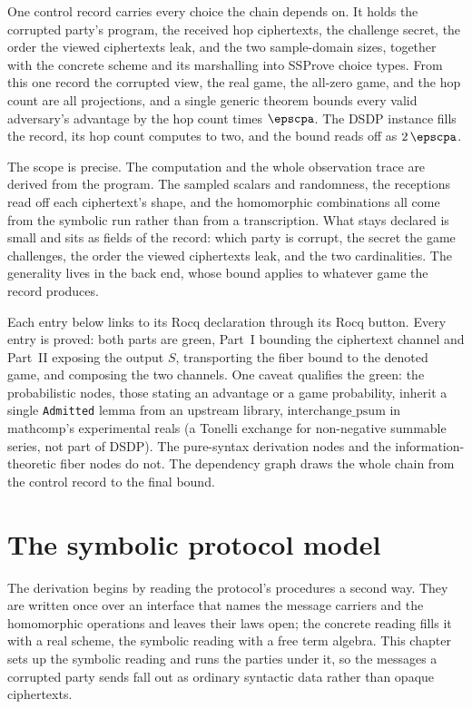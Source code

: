 One control record carries every choice the chain depends on. It holds the
corrupted party's program, the received hop ciphertexts, the challenge secret,
the order the viewed ciphertexts leak, and the two sample-domain sizes, together
with the concrete scheme and its marshalling into SSProve choice types. From this
one record the corrupted view, the real game, the all-zero game, and the hop
count are all projections, and a single generic theorem bounds every valid
adversary's advantage by the hop count times $\epscpa$. The DSDP instance fills
the record, its hop count computes to two, and the bound reads off as
$2\,\epscpa$.

The scope is precise. The computation and the whole observation trace are derived
from the program. The sampled scalars and randomness, the receptions read off
each ciphertext's shape, and the homomorphic combinations all come from the
symbolic run rather than from a transcription. What stays declared is small and
sits as fields of the record: which party is corrupt, the secret the game
challenges, the order the viewed ciphertexts leak, and the two cardinalities. The
generality lives in the back end, whose bound applies to whatever game the record
produces.

Each entry below links to its Rocq declaration through its Rocq button. Every
entry is proved: both parts are green, Part~I bounding the ciphertext channel and
Part~II exposing the output $S$, transporting the fiber bound to the denoted game,
and composing the two channels. One caveat qualifies the green: the probabilistic
nodes, those stating an advantage or a game probability, inherit a single
\texttt{Admitted} lemma from an upstream library, $\mathrm{interchange\_psum}$ in
mathcomp's experimental reals (a Tonelli exchange for non-negative summable
series, not part of DSDP). The pure-syntax derivation nodes and the
information-theoretic fiber nodes do not. The dependency graph draws the whole
chain from the control record to the final bound.

\chapter{The symbolic protocol model}

The derivation begins by reading the protocol's procedures a second way. They are
written once over an interface that names the message carriers and the
homomorphic operations and leaves their laws open; the concrete reading fills it
with a real scheme, the symbolic reading with a free term algebra. This chapter
sets up the symbolic reading and runs the parties under it, so the messages a
corrupted party sends fall out as ordinary syntactic data rather than opaque
ciphertexts.

